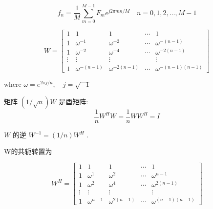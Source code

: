 \begin{definition}
    \begin{equation} f_{n}=\frac{1}{M} \sum_{m=0}^{M-1} F_{m} e^{j 2 \pi m n / M} \quad n=0,1,2, \ldots, M-1 \end{equation}
\end{definition}

\begin{definition}[离散傅里叶变换矩阵$W$]
    \begin{equation} W=\left[\begin{array}{ccccc}1 & 1 & 1 & \cdots & 1 \\ 1 & \omega^{-1} & \omega^{-2} & \cdots & \omega^{-(n-1)} \\ 1 & \omega^{-2} & \omega^{-4} & \cdots & \omega^{-2(n-1)} \\ \vdots & \vdots & \vdots & & \vdots \\ 1 & \omega^{-(n-1)} & \omega^{-2(n-1)} & \cdots & \omega^{-(n-1)(n-1)}\end{array}\right] \end{equation}

    where $ \omega=e^{2 \pi j / n}, \quad j=\sqrt{-1} $
\end{definition}

\begin{corollary}
    矩阵 $ (1 / \sqrt{n}) W $ 是酉矩阵:
\begin{equation}
\frac{1}{n} W^{H} W=\frac{1}{n} W W^{H}=I
\end{equation}
\end{corollary}

\begin{corollary}
    $ W $ 的逆 $ W^{-1}=(1 / n) W^{H} $ .
\end{corollary}

\begin{corollary}
    W的共轭转置为

    \begin{equation} W^{H}=\left[\begin{array}{ccccc}1 & 1 & 1 & \cdots & 1 \\ 1 & \omega^{1} & \omega^{2} & \cdots & \omega^{n-1} \\ 1 & \omega^{2} & \omega^{4} & \cdots & \omega^{2(n-1)} \\ \vdots & \vdots & \vdots & & \vdots \\ 1 & \omega^{n-1} & \omega^{2(n-1)} & \cdots & \omega^{(n-1)(n-1)}\end{array}\right] \end{equation}
\end{corollary}

